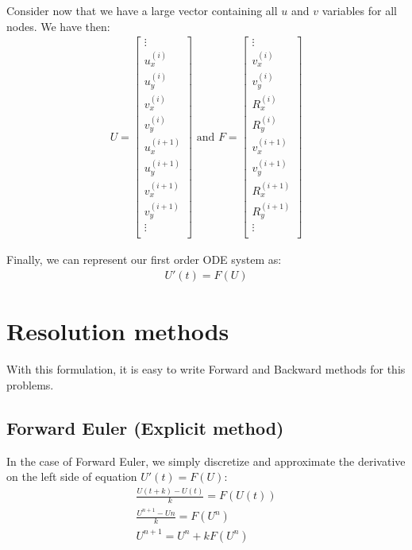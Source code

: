 \documentclass[12pt]{article}
\begin{document}
Consider now that we have a large vector containing all $u$ and $v$ variables for all nodes. We have then:
\begin{align*}
  U = \begin{bmatrix}
    \vdots\\
    u^{(i)}_x\\
    u^{(i)}_y\\
    v^{(i)}_x\\
    v^{(i)}_y\\
    u^{(i+1)}_x\\
    u^{(i+1)}_y\\
    v^{(i+1)}_x\\
    v^{(i+1)}_y\\
    \vdots\\
  \end{bmatrix}
  \text{ and }
  F = \begin{bmatrix}
    \vdots\\
    v^{(i)}_x\\
    v^{(i)}_y\\
    R^{(i)}_x\\
    R^{(i)}_y\\
    v^{(i+1)}_x\\
    v^{(i+1)}_y\\
    R^{(i+1)}_x\\
    R^{(i+1)}_y\\
    \vdots\\
  \end{bmatrix}
\end{align*}

Finally, we can represent our first order ODE system as:
\begin{align*}
U'(t) = F(U)  
\end{align*}

\section{Resolution methods}
With this formulation, it is easy to write Forward and Backward methods for this problems.

\subsection{Forward Euler (Explicit method)}
In the case of Forward Euler, we simply discretize and approximate the derivative on the left side of equation $U'(t) = F(U)$:
\begin{align*}
  \frac{U(t+k) - U(t)}{k} = F(U(t))\\
  \frac{U^{n+1} - U{n}}{k} = F(U^n)\\
  U^{n+1} = U^{n} + k F(U^n)
\end{align*}
\end{document}
